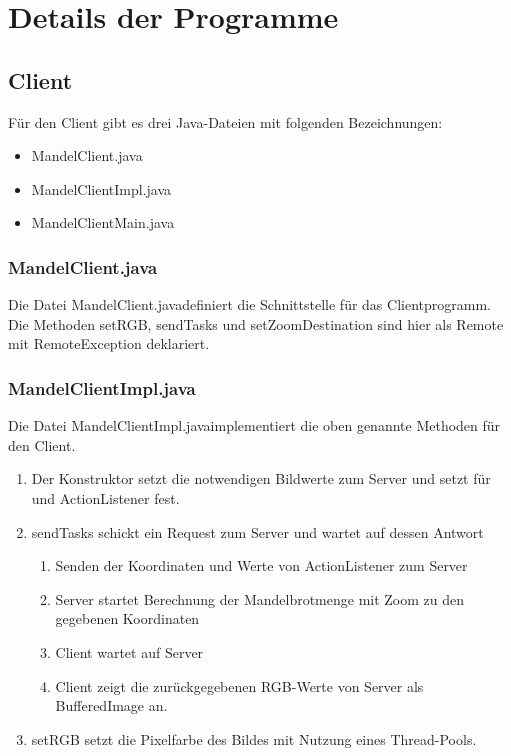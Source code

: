 \documentclass{article}
\begin{document}
\section{Details der Programme}
\subsection{Client}
	Für den Client gibt es drei Java-Dateien mit folgenden Bezeichnungen:
	\begin{itemize}
		\item MandelClient.java
		\item MandelClientImpl.java
		\item MandelClientMain.java
	\end{itemize}
\subsubsection{MandelClient.java}
	Die Datei \glqq MandelClient.java\grqq definiert die Schnittstelle für das Clientprogramm. Die Methoden setRGB, sendTasks und setZoomDestination sind hier als Remote mit RemoteException deklariert.
	

	\newpage
\subsubsection{MandelClientImpl.java}
	Die Datei \glqq MandelClientImpl.java\grqq implementiert die oben genannte Methoden für den Client.\\

	\begin{enumerate}
		\item Der Konstruktor setzt die notwendigen Bildwerte zum Server und setzt für und ActionListener fest.\\
			
		\item sendTasks schickt ein Request zum Server und wartet auf dessen Antwort\\
			\begin{enumerate}
				\item Senden der Koordinaten und Werte von ActionListener zum Server
				\item Server startet Berechnung der Mandelbrotmenge mit Zoom zu den gegebenen Koordinaten
				\item Client wartet auf Server
				\item Client zeigt die zurückgegebenen RGB-Werte von Server als BufferedImage an.
			\end{enumerate}
			
		\item setRGB setzt die Pixelfarbe des Bildes mit Nutzung eines Thread-Pools.
			
	\end{enumerate}
	
\end{document}
